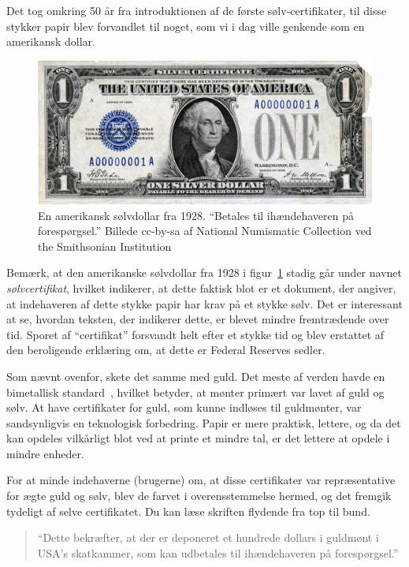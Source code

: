 \documentclass[paper=6in:9in,pagesize=pdftex,
               headinclude=on,footinclude=on,12pt]{scrbook}
\begin{document}
Det tog omkring 50 år fra introduktionen af de første sølv-certifikater, til disse stykker papir blev forvandlet til noget, som vi i dag ville genkende som en amerikansk dollar.\begin{figure}
  \centering
  \includegraphics{assets/images/us-silver-dollar-note-smaller.png}
  \caption{En amerikansk sølvdollar fra 1928. \enquote{Betales til ihændehaveren på forespørgsel.} Billede cc-by-sa af National Numismatic Collection ved the Smithsonian Institution}
  \label{fig:us-silver-dollar-note-smaller}
\end{figure}

Bemærk, at den amerikanske sølvdollar fra 1928 i figur~\ref{fig:us-silver-dollar-note-smaller} stadig går under navnet \textit{sølvcertifikat}, hvilket indikerer, at dette faktisk blot er et dokument, der angiver, at indehaveren af dette stykke papir har krav på et stykke sølv. Det er interessant at se, hvordan teksten, der indikerer dette, er blevet mindre fremtrædende over tid. Sporet af \enquote{certifikat} forsvandt helt efter et stykke tid og blev erstattet af den beroligende erklæring om, at dette er Federal Reserves sedler.

Som nævnt ovenfor, skete det samme med guld. Det meste af verden havde en bimetallisk standard~\cite{wiki:bimetallism}, hvilket betyder, at mønter primært var lavet af guld og sølv. At have certifikater for guld, som kunne indløses til guldmønter, var sandsynligvis en teknologisk forbedring. Papir er mere praktisk, lettere, og da det kan opdeles vilkårligt blot ved at printe et mindre tal, er det lettere at opdele i mindre enheder.

For at minde indehaverne (brugerne) om, at disse certifikater var repræsentative for ægte guld og sølv, blev de farvet i overensstemmelse hermed, og det fremgik tydeligt af selve certifikatet. Du kan læse skriften flydende fra top til bund.\begin{quotation}\begin{samepage} \enquote{Dette bekræfter, at der er deponeret et hundrede dollars i guldmønt i USA's skatkammer, som kan udbetales til ihændehaveren på forespørgsel.} \end{samepage}\end{quotation}
\end{document}
